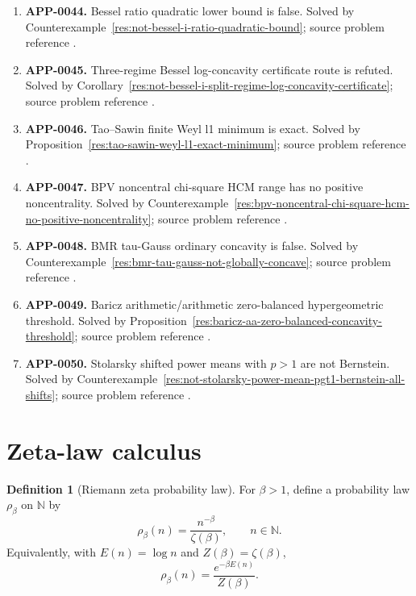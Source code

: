\documentclass[11pt]{article}
\numberwithin{equation}{section}
\theoremstyle{definition}
\newtheorem{definition}[theorem]{Definition}
\theoremstyle{remark}
\newcommand{\N}{\mathbb N}
\newcommand{\1}{\mathbf 1}
\begin{document}
\begin{enumerate}
\item \label{ledger:app-0044}\textbf{APP-0044.} Bessel ratio quadratic lower bound is false. Solved by Counterexample~\ref{res:not-bessel-i-ratio-quadratic-bound}; source problem reference \cite{app-app-0042-source}.
\item \label{ledger:app-0045}\textbf{APP-0045.} Three-regime Bessel log-concavity certificate route is refuted. Solved by Corollary~\ref{res:not-bessel-i-split-regime-log-concavity-certificate}; source problem reference \cite{app-app-0042-source}.
\item \label{ledger:app-0046}\textbf{APP-0046.} Tao--Sawin finite Weyl l1 minimum is exact. Solved by Proposition~\ref{res:tao-sawin-weyl-l1-exact-minimum}; source problem reference \cite{app-app-0046-source}.
\item \label{ledger:app-0047}\textbf{APP-0047.} BPV noncentral chi-square HCM range has no positive noncentrality. Solved by Counterexample~\ref{res:bpv-noncentral-chi-square-hcm-no-positive-noncentrality}; source problem reference \cite{app-app-0047-source}.
\item \label{ledger:app-0048}\textbf{APP-0048.} BMR tau-Gauss ordinary concavity is false. Solved by Counterexample~\ref{res:bmr-tau-gauss-not-globally-concave}; source problem reference \cite{app-app-0048-source}.
\item \label{ledger:app-0049}\textbf{APP-0049.} Baricz arithmetic/arithmetic zero-balanced hypergeometric threshold. Solved by Proposition~\ref{res:baricz-aa-zero-balanced-concavity-threshold}; source problem reference \cite{app-app-0049-source}.
\item \label{ledger:app-0050}\textbf{APP-0050.} Stolarsky shifted power means with \(p>1\) are not Bernstein. Solved by Counterexample~\ref{res:not-stolarsky-power-mean-pgt1-bernstein-all-shifts}; source problem reference \cite{app-app-0050-source}.
\end{enumerate}

\section{Zeta-law calculus}

\begin{definition}[Riemann zeta probability law]
\label{def:zeta-law}
For \(\beta>1\), define a probability law \(\rho_\beta\) on \(\N\) by
\begin{equation}
\label{eq:zeta-law}
\rho_\beta(n)=\frac{n^{-\beta}}{\zeta(\beta)},\qquad n\in\N.
\end{equation}
Equivalently, with \(E(n)=\log n\) and \(Z(\beta)=\zeta(\beta)\),
\begin{equation}
\label{eq:gibbs-form}
\rho_\beta(n)=\frac{e^{-\beta E(n)}}{Z(\beta)}.
\end{equation}
\end{definition}
\end{document}
